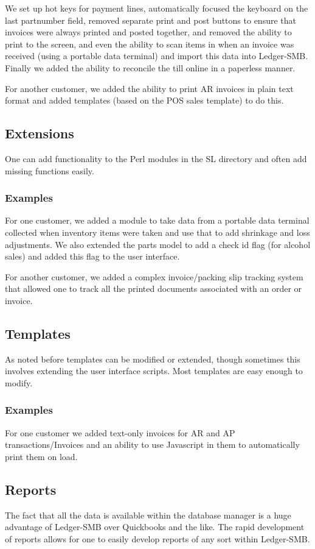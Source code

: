 \documentclass{article}
\begin{document}
We set up hot keys for payment lines, automatically focused
the keyboard on the last partnumber field, removed separate print and post
buttons to ensure that invoices were always printed and posted together, and
removed the ability to print to the screen, and even the ability to scan items
in when an invoice was received (using a portable data terminal) and import this
data into Ledger-SMB.  Finally we added the ability to reconcile the till online
in a paperless manner.

For another customer, we added the ability to print AR invoices in plain text
format and added templates (based on the POS sales template) to do this.

\subsection{Extensions}
One can add functionality to the Perl modules in the SL directory and often add
missing functions easily.

\subsubsection{Examples}
For one customer, we added a module to take data from a portable data terminal
collected when inventory items were taken and use that to add shrinkage and loss
adjustments.  We also extended the parts model to add a check id flag (for
alcohol sales) and added this flag to the user interface.

For another customer, we added a complex invoice/packing slip tracking system
that allowed one to track all the printed documents associated with an order or
invoice.

\subsection{Templates}
As noted before templates can be modified or extended, though sometimes this
involves extending the user interface scripts.  Most templates are easy enough
to modify.
\subsubsection{Examples}
For one customer we added text-only invoices for AR and AP
transactions/Invoices and an ability to use Javascript in them to automatically
print them on load.

\subsection{Reports}
The fact that all the data is available within the database manager is a huge
advantage of Ledger-SMB over Quickbooks and the like.  The rapid development of
reports allows for one to easily develop reports of any sort within Ledger-SMB.
\end{document}
